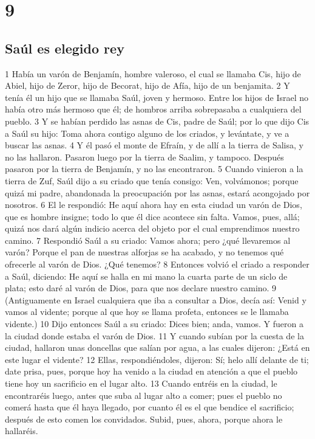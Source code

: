 \chapter{9}

\section*{Saúl es elegido rey}


1 Había un varón de Benjamín, hombre valeroso, el cual se llamaba Cis, hijo de Abiel, hijo de Zeror, hijo de Becorat, hijo de Afía, hijo de un benjamita.
2 Y tenía él un hijo que se llamaba Saúl, joven y hermoso. Entre los hijos de Israel no había otro más hermoso que él; de hombros arriba sobrepasaba a cualquiera del pueblo.
3 Y se habían perdido las asnas de Cis, padre de Saúl; por lo que dijo Cis a Saúl su hijo: Toma ahora contigo alguno de los criados, y levántate, y ve a buscar las asnas.
4 Y él pasó el monte de Efraín, y de allí a la tierra de Salisa, y no las hallaron. Pasaron luego por la tierra de Saalim, y tampoco. Después pasaron por la tierra de Benjamín, y no las encontraron.
5 Cuando vinieron a la tierra de Zuf, Saúl dijo a su criado que tenía consigo: Ven, volvámonos; porque quizá mi padre, abandonada la preocupación por las asnas, estará acongojado por nosotros.
6 El le respondió: He aquí ahora hay en esta ciudad un varón de Dios, que es hombre insigne; todo lo que él dice acontece sin falta. Vamos, pues, allá; quizá nos dará algún indicio acerca del objeto por el cual emprendimos nuestro camino.
7 Respondió Saúl a su criado: Vamos ahora; pero ¿qué llevaremos al varón? Porque el pan de nuestras alforjas se ha acabado, y no tenemos qué ofrecerle al varón de Dios. ¿Qué tenemos?
8 Entonces volvió el criado a responder a Saúl, diciendo: He aquí se halla en mi mano la cuarta parte de un siclo de plata;  esto daré al varón de Dios, para que nos declare nuestro camino.
9 (Antiguamente en Israel cualquiera que iba a consultar a Dios, decía así: Venid y vamos al vidente; porque al que hoy se llama profeta, entonces se le llamaba vidente.)
10 Dijo entonces Saúl a su criado: Dices bien; anda, vamos. Y fueron a la ciudad donde estaba el varón de Dios.
11 Y cuando subían por la cuesta de la ciudad, hallaron unas doncellas que salían por agua, a las cuales dijeron: ¿Está en este lugar el vidente?
12 Ellas, respondiéndoles, dijeron: Sí; helo allí delante de ti; date prisa, pues, porque hoy ha venido a la ciudad en atención a que el pueblo tiene hoy un sacrificio en el lugar alto.
13 Cuando entréis en la ciudad, le encontraréis luego, antes que suba al lugar alto a comer; pues el pueblo no comerá hasta que él haya llegado, por cuanto él es el que bendice el sacrificio; después de esto comen los convidados. Subid, pues, ahora, porque ahora le hallaréis.
